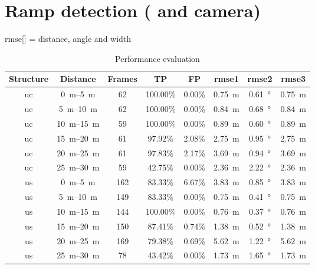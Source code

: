\section{Ramp detection ( and camera)}
rmse[] = distance, angle and width

\begin{table}[htbp]
	\centering
	\caption{Performance evaluation}
	\label{tab:eval_table}
	\begin{tabular}[t]{cccccccc}
		\toprule
		\textbf{Structure} & \textbf{Distance}        & \textbf{Frames} & \textbf{TP} & \textbf{FP} & \textbf{rmse1}    & \textbf{rmse2}     & \textbf{rmse3}    \\
		\midrule
		uc                 & \SIrange{0}{5}{\metre}   & 62              & 100.00\%    & 0.00\%      & \SI{0.75}{\metre} & \SI{0.61}{\degree} & \SI{0.75}{\metre} \\
		uc                 & \SIrange{5}{10}{\metre}  & 62              & 100.00\%    & 0.00\%      & \SI{0.84}{\metre} & \SI{0.68}{\degree} & \SI{0.84}{\metre} \\
		uc                 & \SIrange{10}{15}{\metre} & 59              & 100.00\%    & 0.00\%      & \SI{0.89}{\metre} & \SI{0.60}{\degree} & \SI{0.89}{\metre} \\
		uc                 & \SIrange{15}{20}{\metre} & 61              & 97.92\%     & 2.08\%      & \SI{2.75}{\metre} & \SI{0.95}{\degree} & \SI{2.75}{\metre} \\
		uc                 & \SIrange{20}{25}{\metre} & 61              & 97.83\%     & 2.17\%      & \SI{3.69}{\metre} & \SI{0.94}{\degree} & \SI{3.69}{\metre} \\
		uc                 & \SIrange{25}{30}{\metre} & 59              & 42.75\%     & 0.00\%      & \SI{2.36}{\metre} & \SI{2.22}{\degree} & \SI{2.36}{\metre} \\
		us                 & \SIrange{0}{5}{\metre}   & 162             & 83.33\%     & 6.67\%      & \SI{3.83}{\metre} & \SI{0.85}{\degree} & \SI{3.83}{\metre} \\
		us                 & \SIrange{5}{10}{\metre}  & 149             & 83.33\%     & 0.00\%      & \SI{0.75}{\metre} & \SI{0.41}{\degree} & \SI{0.75}{\metre} \\
		us                 & \SIrange{10}{15}{\metre} & 144             & 100.00\%    & 0.00\%      & \SI{0.76}{\metre} & \SI{0.37}{\degree} & \SI{0.76}{\metre} \\
		us                 & \SIrange{15}{20}{\metre} & 150             & 87.41\%     & 0.74\%      & \SI{1.38}{\metre} & \SI{0.52}{\degree} & \SI{1.38}{\metre} \\
		us                 & \SIrange{20}{25}{\metre} & 169             & 79.38\%     & 0.69\%      & \SI{5.62}{\metre} & \SI{1.22}{\degree} & \SI{5.62}{\metre} \\
		us                 & \SIrange{25}{30}{\metre} & 78              & 43.42\%     & 0.00\%      & \SI{1.73}{\metre} & \SI{1.65}{\degree} & \SI{1.73}{\metre} \\
		\bottomrule
	\end{tabular}
\end{table}

